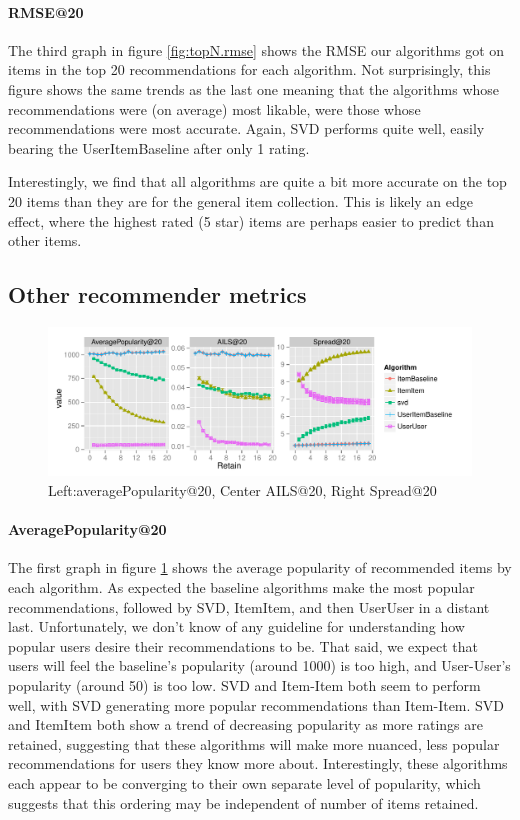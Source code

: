 \documentclass[letterpaper]{sig-alternate}
\begin{document}
  \paragraph{RMSE@20}
  The third graph in figure \ref{fig:topN.rmse} shows the RMSE our algorithms got on items in the top 20 recommendations for each algorithm.
  Not surprisingly, this figure shows the same trends as the last one meaning that the algorithms whose recommendations were (on average) most likable, were those whose recommendations were most accurate.
  Again, SVD performs quite well, easily bearing the UserItemBaseline after only 1 rating.
  
  Interestingly, we find that all algorithms are quite a bit more accurate on the top 20 items than they are for the general item collection.
  This is likely an edge effect, where the highest rated (5 star) items are perhaps easier to predict than other items.

\subsection{Other recommender metrics}

\begin{figure}[ht!]
  \centering
  \includegraphics[width=1.05\linewidth]{../lenskit/output/ekstrandTuned20/popdiv.pdf}
  \caption{Left:averagePopularity@20, Center AILS@20, Right Spread@20}
  \label{fig:pop}
\end{figure}

  \paragraph{AveragePopularity@20}
  The first graph in figure \ref{fig:pop} shows the average popularity of recommended items by each algorithm.
  As expected the baseline algorithms make the most popular recommendations, followed by SVD, ItemItem, and then UserUser in a distant last.
  Unfortunately, we don't know of any guideline for understanding how popular users desire their recommendations to be.
  That said, we expect that users will feel the baseline's popularity (around 1000) is too high, and User-User's popularity (around 50) is too low.
  SVD and Item-Item both seem to perform well, with SVD generating more popular recommendations than Item-Item.
  SVD and ItemItem both show a trend of decreasing popularity as more ratings are retained, suggesting that these algorithms will make more nuanced, less popular recommendations for users they know more about.
  Interestingly, these algorithms each appear to be converging to their own separate level of popularity, which suggests that this ordering may be independent of number of items retained.
\end{document}
